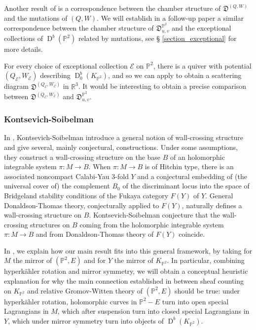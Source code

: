 \documentclass[12pt, a4paper]{amsart}
\newcommand\PP{\mathbb P}
\newcommand\R{\mathbb R}
\newcommand\cE{\mathcal E}
\newcommand\fD{\mathfrak D}
\newcommand\D{\operatorname{D}}
\begin{document}
Another result of \cite{MR3710055} is a correspondence between the chamber structure of 
$\fD^{(Q,W)}$ and the mutations of 
$(Q,W)$. We will establish in a follow-up paper a similar 
correspondence between the chamber structure of 
$\fD^{\PP^2}_{u,v}$ and the exceptional collections of  
$\D^b(\PP^2)$ related by mutations, see \S
\ref{section_exceptional} for more details.

For every choice of exceptional collection $\cE$ on 
$\PP^2$, there is a quiver with potential
$(Q_\cE,W_\cE)$ describing $\D^b_0(K_{\PP^2})$, and so we can apply \cite{MR3710055} to obtain a scattering diagram $\fD^{(Q_\cE,W_\cE)}$ in $\R^3$. It would be interesting to obtain a precise comparison between $\fD^{(Q_\cE,W_\cE)}$ and $\fD^{\PP^2}_{u,v}$.

\subsubsection{Kontsevich-Soibelman} \label{subsubKS}
In
\cite{MR3330788}, Kontsevich-Soibelman introduce a general notion of wall-crossing 
structure and give several, mainly conjectural, constructions.
Under some assumptions, they construct a wall-crossing structure on the base 
$B$ of an holomorphic integrable system $\pi \colon M \rightarrow B$. 
When $\pi \colon M \rightarrow B$ is of Hitchin type, there is an associated 
noncompact Calabi-Yau 3-fold $Y$ and a conjectural embedding of (the universal cover of)
the complement $B_0$ of the discriminant locus into the space of Bridgeland stability conditions of the Fukaya category
$F(Y)$ of $Y$. General Donaldson-Thomas theory, conjecturally applied to $F(Y)$,
naturally defines a wall-crossing structure on $B$. Kontsevich-Soibelman conjecture 
that the wall-crossing structures on $B$
coming from the holomorphic integrable system $\pi \colon M \rightarrow B$ and
from Donaldson-Thomas theory of $F(Y)$ coincide. 

In \cite[\S 6]{bousseau2019takahashi}, we explain how our main result fits into this general framework, by taking for $M$
the mirror of $(\PP^2,E)$ and for $Y$ the mirror of $K_{\PP^2}$.
In particular, combining hyperkähler rotation and mirror symmetry, we will obtain a conceptual heuristic explanation for why the main connection established in \cite{bousseau2019takahashi} between sheaf counting on 
$K_{\PP^2}$ and relative Gromov-Witten theory of
$(\PP^2,E)$ should be true: 
under hyperkähler rotation, holomorphic curves in $\PP^2-E$ turn into open special Lagrangians in $M$, which after suspension turn into closed special Lagrangians in $Y$, which under mirror symmetry turn into objects of $\D^b(K_{\PP^2})$. 
\end{document}
